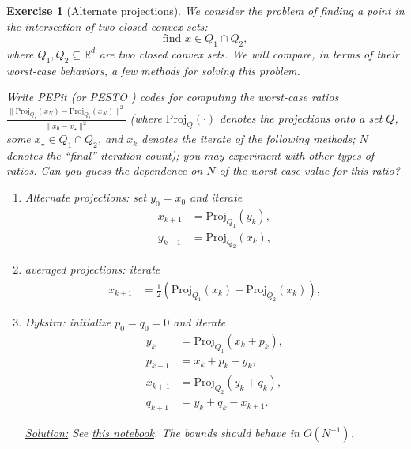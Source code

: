 \documentclass[11pt,a4paper]{article}
\newcommand{\pesto}{{PESTO }}
\newcommand{\pepit}{{PEPit }}
\newcommand{\correction}[1]{{{\color{blue}\underline{Solution:} #1}}}
\newcommand{\correction}[1]{}
\newtheorem{exercise}{Exercise}
\begin{document}
\begin{exercise}[Alternate projections]\label{ex:alt} We consider the problem of finding a point in the intersection of two closed convex sets:
	\[ \text{find } x \in Q_1\cap Q_2,\]
where $Q_1,Q_2\subseteq \mathbb{R}^d$ are two closed convex sets. We will compare, in terms of their worst-case behaviors, a few methods for solving this problem. 

Write \pepit (or \pesto\!\!) codes for computing the worst-case ratios $\frac{\|\mathrm{Proj}_{Q_1}(x_N)-\mathrm{Proj}_{Q_2}(x_N)\|^2}{\|x_0-x_\star\|^2}$ (where $\mathrm{Proj}_Q(\cdot)$ denotes the projections onto a set $Q$, some $x_\star\in Q_1\cap Q_2$, and $x_k$ denotes the iterate of the following methods; $N$ denotes the ``final'' iteration count); you may experiment with other types of ratios. Can you guess the dependence on $N$ of the worst-case value for this ratio?
	\begin{enumerate}
	\item Alternate projections: set $y_0=x_0$ and iterate
	\begin{equation*}
	\begin{aligned}
	x_{k+1}&=\mathrm{Proj}_{Q_1}(y_k),\\
	y_{k+1}&=\mathrm{Proj}_{Q_2}(x_k),
	\end{aligned}
	\end{equation*}
	\item averaged projections: iterate
	\begin{equation*}
	\begin{aligned}
	x_{k+1}&= \frac12 \left(\mathrm{Proj}_{Q_1}(x_k)+\mathrm{Proj}_{Q_2}(x_k)\right),
	\end{aligned}
	\end{equation*}
	\item Dykstra: initialize $p_0=q_0=0$ and iterate
	\begin{equation*}
	\begin{aligned}
	y_{k}&=\mathrm{Proj}_{Q_1}(x_k+p_k),\\
	p_{k+1}&=x_k+p_k-y_k,\\
	x_{k+1}&=\mathrm{Proj}_{Q_2}(y_k+q_k),\\
	q_{k+1}&=y_k+q_k-x_{k+1}.
	\end{aligned}
	\end{equation*}
	
	\correction{See \href{https://github.com/PerformanceEstimation/Learning-Performance-Estimation/tree/main/Codes/Jupyter/Exercise11.ipynb}{this notebook}. The bounds should behave in $O(N^{-1})$.}
	\end{enumerate}
	\end{exercise}
\end{document}
